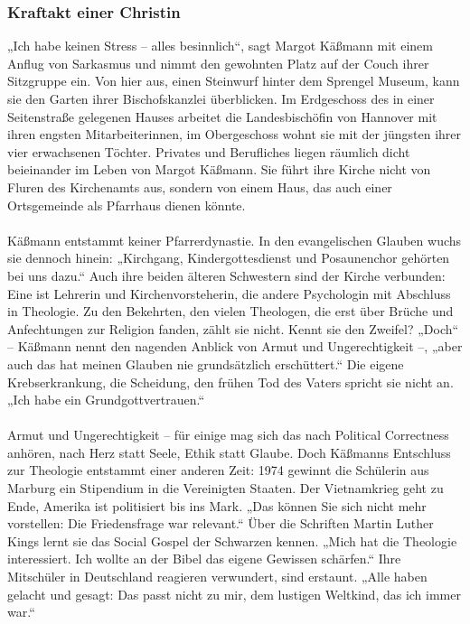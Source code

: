 \documentclass[a4paper,12pt,twoside]{scrbook}
\begin{document}
\subsubsection{Kraftakt einer Christin}
„Ich habe keinen Stress – alles besinnlich“, sagt Margot Käßmann mit einem Anflug von Sarkasmus und nimmt den gewohnten Platz auf der Couch ihrer Sitzgruppe ein. Von hier aus, einen Steinwurf hinter dem Sprengel Museum, kann sie den Garten ihrer Bischofskanzlei überblicken. Im Erdgeschoss des in einer Seitenstraße gelegenen Hauses arbeitet die Landesbischöfin von Hannover mit ihren engsten Mitarbeiterinnen, im Obergeschoss wohnt sie mit der jüngsten ihrer vier erwachsenen Töchter. Privates und Berufliches liegen räumlich dicht beieinander im Leben von Margot Käßmann. Sie führt ihre Kirche nicht von Fluren des Kirchenamts aus, sondern von einem Haus, das auch einer Ortsgemeinde als Pfarrhaus dienen könnte.
\\\\
Käßmann entstammt keiner Pfarrerdynastie. In den evangelischen Glauben wuchs sie dennoch hinein: „Kirchgang, Kindergottesdienst und Posaunenchor gehörten bei uns dazu.“ Auch ihre beiden älteren Schwestern sind der Kirche verbunden: Eine ist Lehrerin und Kirchenvorsteherin, die andere Psychologin mit Abschluss in Theologie. Zu den Bekehrten, den vielen Theologen, die erst über Brüche und Anfechtungen zur Religion fanden, zählt sie nicht. Kennt sie den Zweifel? „Doch“ – Käßmann nennt den nagenden Anblick von Armut und Ungerechtigkeit –, „aber auch das hat meinen Glauben nie grundsätzlich erschüttert.“ Die eigene Krebserkrankung, die Scheidung, den frühen Tod des Vaters spricht sie nicht an. „Ich habe ein Grundgottvertrauen.“
\\\\
Armut und Ungerechtigkeit – für einige mag sich das nach Political Correctness anhören, nach Herz statt Seele, Ethik statt Glaube. Doch Käßmanns Entschluss zur Theologie entstammt einer anderen Zeit: 1974 gewinnt die Schülerin aus Marburg ein Stipendium in die Vereinigten Staaten. Der Vietnamkrieg geht zu Ende, Amerika ist politisiert bis ins Mark. „Das können Sie sich nicht mehr vorstellen: Die Friedensfrage war relevant.“ Über die Schriften Martin Luther Kings lernt sie das Social Gospel der Schwarzen kennen. „Mich hat die Theologie interessiert. Ich wollte an der Bibel das eigene Gewissen schärfen.“ Ihre Mitschüler in Deutschland reagieren verwundert, sind erstaunt. „Alle haben gelacht und gesagt: Das passt nicht zu mir, dem lustigen Weltkind, das ich immer war.“
\end{document}
